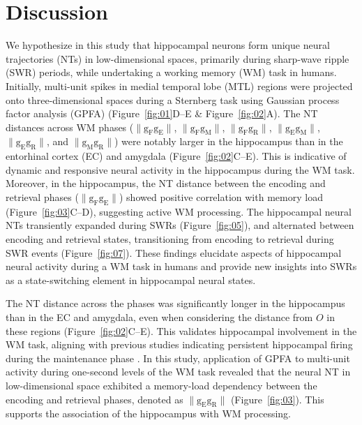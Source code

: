\section{Discussion}
We hypothesize in this study that hippocampal neurons form unique neural trajectories (NTs) in low-dimensional spaces, primarily during sharp-wave ripple (SWR) periods, while undertaking a working memory (WM) task in humans. Initially, multi-unit spikes in medial temporal lobe (MTL) regions were projected onto three-dimensional spaces during a Sternberg task using Gaussian process factor analysis (GPFA) (Figure~\ref{fig:01}D--E \& Figure~\ref{fig:02}A). The NT distances across WM phases ($\mathrm{\lVert g_{F}g_{E} \rVert}$, $\mathrm{\lVert g_{F}g_{M} \rVert}$, $\mathrm{\lVert g_{F}g_{R} \rVert}$, $\mathrm{\lVert g_{E}g_{M} \rVert}$, $\mathrm{\lVert g_{E}g_{R} \rVert}$, and $\mathrm{\lVert g_{M}g_{R} \rVert}$) were notably larger in the hippocampus than in the entorhinal cortex (EC) and amygdala (Figure~\ref{fig:02}C--E). This is indicative of dynamic and responsive neural activity in the hippocampus during the WM task. Moreover, in the hippocampus, the NT distance between the encoding and retrieval phases ($\mathrm{\lVert g_{F}g_{E} \rVert}$) showed positive correlation with memory load (Figure~\ref{fig:03}C--D), suggesting active WM processing. The hippocampal neural NTs transiently expanded during SWRs (Figure~\ref{fig:05}), and alternated between encoding and retrieval states, transitioning from encoding to retrieval during SWR events (Figure~\ref{fig:07}). These findings elucidate aspects of hippocampal neural activity during a WM task in humans and provide new insights into SWRs as a state-switching element in hippocampal neural states.

The NT distance across the phases was significantly longer in the hippocampus than in the EC and amygdala, even when considering the distance from $O$ in these regions (Figure~\ref{fig:02}C--E). This validates hippocampal involvement in the WM task, aligning with previous studies indicating persistent hippocampal firing during the maintenance phase \cite{boran_persistent_2019} \cite{kaminski_persistently_2017} \cite{kornblith_persistent_2017} \cite{faraut_dataset_2018}. In this study, application of GPFA to multi-unit activity during one-second levels of the WM task revealed that the neural NT in low-dimensional space exhibited a memory-load dependency between the encoding and retrieval phases, denoted as $\mathrm{\lVert g_{E}g_{R} \rVert}$ (Figure~\ref{fig:03}). This supports the association of the hippocampus with WM processing.

